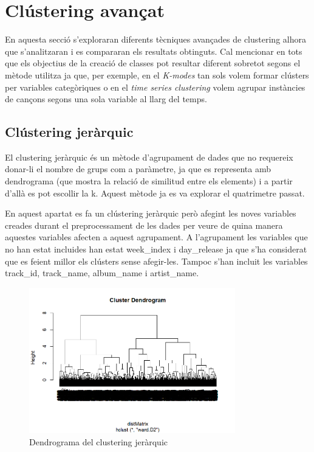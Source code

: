


\newpage

\section{Clústering avançat} 

En aquesta secció s'exploraran diferents tècniques avançades de clustering alhora que s'analitzaran i es compararan els resultats obtinguts. Cal mencionar en tots que els objectius de la creació de classes pot resultar diferent sobretot segons el mètode utilitza ja que, per exemple, en el \textit{K-modes} tan sols volem formar clústers per variables categòriques o en el \textit{time series clustering} volem agrupar instàncies de cançons segons una sola variable al llarg del temps.

\subsection{Clústering jeràrquic} \label{section:clustering_jerarquic3}

El clustering jeràrquic és un mètode d'agrupament de dades que no requereix donar-li el nombre de grups com a paràmetre, ja que es representa amb dendrograma (que mostra la relació de similitud entre els elements) i a partir d'allà es pot escollir la k. Aquest mètode ja es va explorar el quatrimetre passat.

En aquest apartat es fa un clústering jeràrquic però afegint les noves variables creades durant el preprocessament de les dades per veure de quina manera aquestes variables afecten a aquest agrupament. A l'agrupament les variables que no han estat incluides han estat week\_index i day\_release ja que s'ha considerat que es feient millor els clústers sense afegir-les. Tampoc s'han incluit les variables track\_id, track\_name, album\_name i artist\_name. 

\begin{figure}[H]
    \centering
    \includegraphics[width=0.8\textwidth]{Images/4_clustering/herarchical/dendogram.png}
    \caption{Dendrograma del clustering jeràrquic}
    \label{fig:dendogram}
\end{figure}

